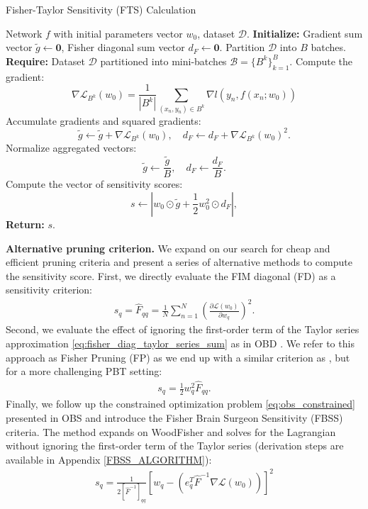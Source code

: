 \begin{algorithm}[t]
    \caption{Fisher-Taylor Sensitivity (FTS) Calculation}
    \label{alg:fts_calculation}
    \begin{algorithmic}
     Network \(f\) with initial parameters vector \(w_0\), dataset \(\mathcal{D}\).
    \STATE \textbf{Initialize:} Gradient sum vector \(\tilde{g} \gets \mathbf{0}\), Fisher diagonal sum vector \(d_{F} \gets \mathbf{0}\).
    \STATE Partition \(\mathcal{D}\) into \(B\) batches.
    \STATE \textbf{Require:} Dataset $\mathcal{D}$ partitioned into mini-batches $\mathcal{B} = \{B^{k}\}_{k=1}^{B}$.
        \STATE Compute the gradient:
        \[
        \nabla \mathcal{L}_{B^k}(w_0) = \frac{1}{|B^k|} \sum_{(x_n, y_n) \in B^k} \nabla l(y_n, f(x_n;w_0))
        \]
        \STATE Accumulate gradients and squared gradients:
        \[
        \tilde{g} \gets \tilde{g} + \nabla \mathcal{L}_{B^k}(w_0), \quad d_{F} \gets d_{F} + \nabla \mathcal{L}_{B^k}(w_0)^2.
        \]
    \ENDFOR
    \STATE Normalize aggregated vectors:
    \[
    \tilde{g} \gets \frac{\tilde{g}}{B}, \quad d_{F} \gets \frac{d_{F}}{B}.
    \]
    \STATE Compute the vector of sensitivity scores:
    \[
    s \gets \left| w_0 \odot \tilde{g} + \frac{1}{2} w_0^2 \odot d_{F} \right|,
    \]
    \STATE \textbf{Return:} \(s\).
    \end{algorithmic}
\end{algorithm}

\textbf{Alternative pruning criterion.} We expand on our search for cheap and efficient pruning criteria and present a series of alternative methods to compute the sensitivity score. First, we directly evaluate the FIM diagonal (FD) as a sensitivity criterion:
\begin{align}
    s_q = \hat{F}_{qq} = \frac{1}{N} \sum_{n=1}^{N} \left( \frac{\partial \mathcal{L}(w_0)}{\partial w_q} \right)^2.
    \label{eq:Fisher_Diagonal}
\end{align}
Second, we evaluate the effect of ignoring the first-order term of the Taylor series approximation \eqref{eq:fisher_diag_taylor_series_sum} as in OBD \cite{lecun1989optimal}. We refer to this approach as Fisher Pruning (FP) as we end up with a similar criterion as \citet{theis2018faster}, but for a more challenging PBT setting:
\begin{align}
    s_q = \frac{1}{2} w_q^2 \hat{F}_{qq}.
\end{align}
Finally, we follow up the constrained optimization problem \eqref{eq:obs_constrained} presented in OBS \cite{hassibi1992second} and introduce the Fisher Brain Surgeon Sensitivity (FBSS) criteria. The method expands on WoodFisher \cite{singh2020woodfisher} and solves for the Lagrangian without ignoring the first-order term of the Taylor series (derivation steps are available in Appendix \ref{FBSS_ALGORITHM}):
\begin{align}
    \label{eq:FBSS}
    s_q = \frac{1}{2[\hat{F}^{-1}]_{qq}}
        \left[
            w_q - (e_q^T \hat{F}^{-1} \nabla \mathcal{L}(w_0))
        \right]^2
\end{align}
